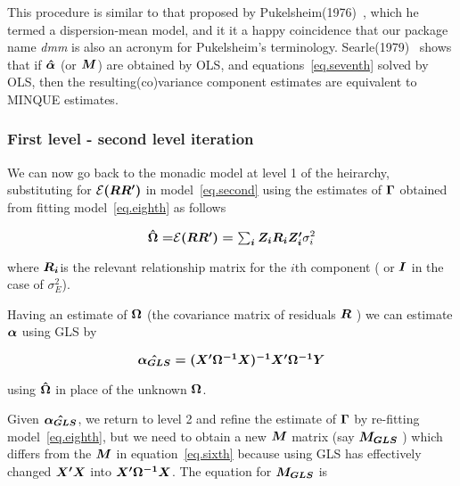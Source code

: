 \documentclass[titlepage]{article}  %
\begin{document}
This procedure is similar to that proposed by Pukelsheim(1976)~\cite{puke:76}, which he termed a dispersion-mean model, and it it a happy coincidence that our package name {\em dmm} is also an acronym for Pukelsheim's terminology. Searle(1979)~\cite{sear:79} shows that if $\mbox{\boldmath $\hat{\alpha}$}$ (or $\mbox{\boldmath $M$}$) are obtained by OLS, and equations~\ref{eq.seventh} solved by OLS, then the resulting(co)variance component estimates are equivalent to MINQUE estimates.

\subsubsection{First level - second level iteration}
We can now go back to the monadic model at level 1 of the heirarchy, substituting for ${\cal E}\mbox{\boldmath $(R R^{\prime})$}$ in model~\ref{eq.second} using the estimates of $\mbox{\boldmath $\Gamma$}$ obtained from fitting model~\ref{eq.eighth} as follows

\begin{displaymath}
\mbox{\boldmath $\hat{\Omega} = $}{\cal E}\mbox{\boldmath $(R R^{\prime}) = \sum_{i} Z_{i} R_{i} Z_{i}^{\prime}$} \sigma_{i}^{2}
\end{displaymath}

	where $\mbox{\boldmath $R_{i}$}$is the relevant relationship matrix for the $i$th component ( or $\mbox{\boldmath $I$}$ in the case of $\sigma_{E}^{2}$).

Having an estimate of $\mbox{\boldmath $\Omega$}$ (the covariance matrix of residuals $\mbox{\boldmath $R$}$ ) we can estimate $\mbox{\boldmath $\alpha$}$ using GLS by 

\begin{displaymath}
\mbox{\boldmath $\hat{\alpha_{GLS}} = (X^{\prime} \Omega^{-1} X)^{-1} X^{\prime} \Omega^{-1} Y$}
\end{displaymath}

using $\mbox{\boldmath $\hat{\Omega}$}$ in place of the unknown $\mbox{\boldmath $\Omega$}$.

Given $\mbox{\boldmath $\hat{\alpha_{GLS}}$}$, we return to level 2 and refine the estimate of $\mbox{\boldmath $\Gamma$}$ by re-fitting model~\ref{eq.eighth}, but we need to obtain a new $\mbox{\boldmath $M$}$ matrix (say $\mbox{\boldmath $M_{GLS}$}$ ) which differs from the $\mbox{\boldmath $M$}$ in equation~\ref{eq.sixth} because using GLS has effectively changed $\mbox{\boldmath $X^{\prime} X$}$ into $\mbox{\boldmath $X^{\prime} \Omega^{-1} X$}$. The equation for $\mbox{\boldmath $M_{GLS}$}$ is
\end{document}
